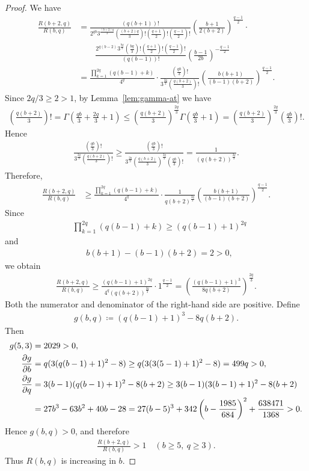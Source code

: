 \documentclass[12pt,reqno]{amsart}
\newcommand{\q}{\quad}									%
\newcommand{\f}[2]{\frac{#1}{#2}}							%
\newcommand{\ceq}{\coloneqq} 							%
\theoremstyle{mythmstyle}
\theoremstyle{mydefstyle}
\newcommand{\lemref}[1]{Lemma~\ref{#1}}
\numberwithin{equation}{section}
\begin{document}
\begin{proof}
\item[\ref{itm:Rbq}] We have
\begin{align}
\f{R(b+2,q)}{R(b,q)} &= \f{(q(b+1))!}{2^{qb}3^{\f{(b+2)q}{3}}\left(\f{(b+2)q}{3}\right)!\left(\f{q+1}{2}\right)!\left(\f{q-1}{2}\right)!}\left(\f{b+1}{2(b+2)}\right)^{\f{q-1}{2}} \cdot \\
&\qquad\f{2^{q(b-2)}3^{\f{bq}{3}}\left(\f{bq}{3}\right)!\left(\f{q+1}{2}\right)!\left(\f{q-1}{2}\right)!}{(q(b-1))!}\left(\f{b-1}{2b}\right)^{-\f{q-1}{2}} \\
&= \f{\prod_{k=1}^{2q}(q(b-1)+k)}{4^{q}}\cdot\f{\left(\f{qb}{3}\right)!}{3^{\f{2q}{3}}\left(\f{q(b+2)}{3}\right)!}
\left(\f{b(b+1)}{(b-1)(b+2)}\right)^{\f{q-1}{2}}.
\end{align}
Since $2q/3 \ge 2 > 1$, by \lemref{lem:gamma-at} we have
\begin{align}
\left(\f{q(b+2)}{3}\right)! = \Gamma\left(\f{qb}{3}+\f{2q}{3}+1\right) \le \left(\f{q(b+2)}{3}\right)^{\f{2q}{3}}\Gamma\left(\f{qb}{3}+1\right)
= \left(\f{q(b+2)}{3}\right)^{\f{2q}{3}}\left(\f{qb}{3}\right)!.
\end{align}
Hence
\begin{align}
\f{\left(\f{qb}{3}\right)!}{3^{\f{2q}{3}}\left(\f{q(b+2)}{3}\right)!} \ge \f{\left(\f{qb}{3}\right)!}{3^{\f{2q}{3}}\left(\f{q(b+2)}{3}\right)^{\f{2q}{3}}\left(\f{qb}{3}\right)!}
= \f{1}{(q(b+2))^{\f{2q}{3}}}.
\end{align}
Therefore,
\begin{align}
\f{R(b+2,q)}{R(b,q)} &\ge \f{\prod_{k=1}^{2q}(q(b-1)+k)}{4^{q}}\cdot\f{1}{q(b+2)^{\f{2q}{3}}}
\left(\f{b(b+1)}{(b-1)(b+2)}\right)^{\f{q-1}{2}}.
\end{align}
Since
\begin{align}
&\prod_{k=1}^{2q}(q(b-1)+k) \ge (q(b-1)+1)^{2q}
\end{align}
and
\begin{align}
&b(b+1) - (b-1)(b+2) = 2 > 0,
\end{align}
we obtain
\begin{align}
\f{R(b+2,q)}{R(b,q)} \ge \f{(q(b-1)+1)^{2q}}{4^{q}(q(b+2))^{\f{2q}{3}}}\cdot 1^{\f{q-1}{2}}
= \left(\f{(q(b-1)+1)^{3}}{8q(b+2)}\right)^{\f{2q}{3}}.
\end{align}
Both the numerator and denominator of the right-hand side are positive. Define
\begin{align}
g(b, q) \ceq (q(b-1)+1)^{3} - 8q(b+2).
\end{align}
Then
\begin{align}
g(5, 3) &= 2029 > 0, \\
\pdv{g}{b} &= q(3(q(b-1)+1)^{2}-8) \ge q(3(3(5-1)+1)^{2}-8) = 499q > 0, \\
\pdv{g}{q} &= 3(b-1)(q(b-1)+1)^{2} - 8(b+2) \ge 3(b-1)(3(b-1)+1)^{2} - 8(b+2) \\
&= 27b^{3}-63b^{2}+40b-28 = 27(b-5)^{3} + 342\left(b-\f{1985}{684}\right)^{2}+\f{638471}{1368} > 0.
\end{align}
Hence $g(b,q) > 0$, and therefore
\begin{align}
\f{R(b+2,q)}{R(b,q)} > 1 \q (b \ge 5,\ q \ge 3).
\end{align}
Thus $R(b,q)$ is increasing in $b$.


\end{proof}
\end{document}
